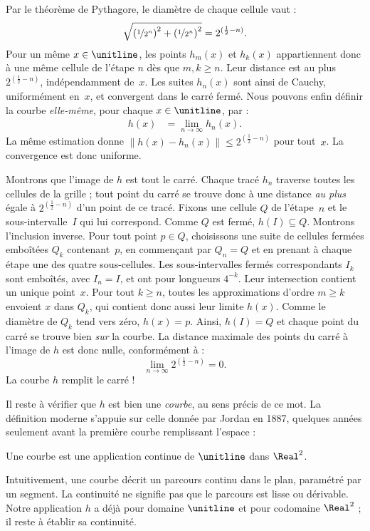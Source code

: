 \documentclass[../../../include/open-logic-section]{subfiles}
\begin{document}
Par le théorème de Pythagore, le diamètre de chaque cellule vaut :
\[
\sqrt{\left(\nicefrac{1}{2^{n}}\right)^2+\left(\nicefrac{1}{2^{n}}\right)^2} = 2^{(\frac{1}{2}-n)}.
\]
Pour un même $x\in\unitline$, les points $h_m(x)$ et $h_k(x)$
appartiennent donc à une même cellule de l'étape $n$ dès que
$m,k\geq n$. Leur distance est au plus
$2^{(\frac{1}{2}-n)}$, indépendamment de~$x$. Les suites
$h_n(x)$ sont ainsi de Cauchy, uniformément en~$x$, et convergent
dans le carré fermé. Nous pouvons enfin définir la courbe
\emph{elle-même}, pour chaque $x \in \unitline$, par :
\begin{align*}
	h(x) &= \lim_{n \rightarrow \infty} h_n(x).
\end{align*}
La même estimation donne
$\|h(x)-h_n(x)\|\leq 2^{(\frac{1}{2}-n)}$ pour tout~$x$.
La convergence est donc uniforme.

Montrons que l'image de $h$ est tout le carré. Chaque tracé
$h_n$ traverse toutes les cellules de la grille ; tout point du
carré se trouve donc à une distance \emph{au plus} égale à
$2^{(\frac{1}{2}-n)}$ d'un point de ce tracé. Fixons une cellule
$Q$ de l'étape~$n$ et le sous-intervalle~$I$ qui lui correspond.
Comme $Q$ est fermé, $h(I)\subseteq Q$. Montrons l'inclusion inverse.
Pour tout point $p\in Q$, choisissons
une suite de cellules fermées emboîtées $Q_k$ contenant~$p$,
en commençant par $Q_n=Q$ et en prenant à chaque étape une
des quatre sous-cellules. Les sous-intervalles fermés
correspondants $I_k$ sont emboîtés, avec $I_n=I$, et ont pour
longueurs $4^{-k}$. Leur intersection contient un unique
point~$x$. Pour tout $k\geq n$, toutes les approximations
d'ordre $m\geq k$ envoient $x$ dans $Q_k$, qui contient
donc aussi leur limite $h(x)$. Comme le diamètre de $Q_k$
tend vers zéro, $h(x)=p$. Ainsi, $h(I)=Q$ et chaque point du carré
se trouve bien \emph{sur} la courbe. La distance maximale des
points du carré à l'image de $h$ est donc nulle, conformément à :
\[
\lim_{n \rightarrow \infty} 2^{(\frac{1}{2}-n)} = 0.
\]
La courbe $h$ remplit le carré !

Il reste à vérifier que $h$ est bien une \emph{courbe}, au sens
précis de ce mot. La définition moderne s'appuie sur celle donnée
par Jordan en 1887, quelques années seulement avant la première
courbe remplissant l'espace :

\begin{defn}
Une courbe est une application continue de $\unitline$ dans
$\Real^2$.
\end{defn}

Intuitivement, une courbe décrit un parcours continu dans le plan,
paramétré par un segment. La continuité ne signifie pas que le
parcours est lisse ou dérivable. Notre application $h$ a déjà
pour domaine $\unitline$ et pour codomaine $\Real^2$ ; il reste
à établir sa continuité.
\end{document}
